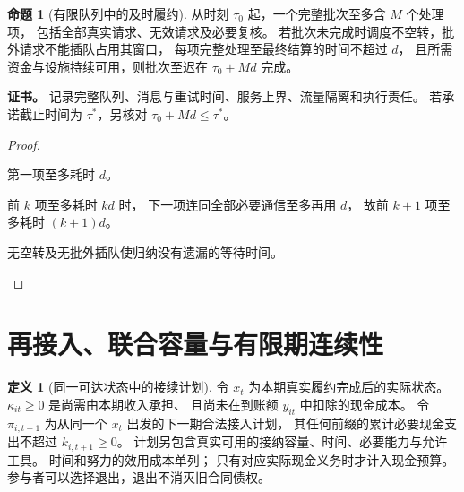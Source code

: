 \documentclass[UTF8,12pt,a4paper,openany,fontset=none,zihao=false]{ctexrep}
\theoremstyle{definition}
\newtheorem{definition}{定义}[chapter]
\newtheorem{proposition}{命题}[chapter]
\newenvironment{certificate}{\par\noindent\textbf{证书。}\ignorespaces}{\par}
\newcommand{\1}{\mathbf 1}
\begin{document}
\begin{proposition}[有限队列中的及时履约]
\label{part:prop-timely-payment}
从时刻 \(\tau_0\) 起，一个完整批次至多含 \(M\) 个处理项，
包括全部真实请求、无效请求及必要复核。
若批次未完成时调度不空转，批外请求不能插队占用其窗口，
每项完整处理至最终结算的时间不超过 \(d\)，
且所需资金与设施持续可用，则批次至迟在 \(\tau_0+Md\) 完成。
\end{proposition}
\begin{certificate}
记录完整队列、消息与重试时间、服务上界、流量隔离和执行责任。
若承诺截止时间为 \(\tau^\ast\)，另核对 \(\tau_0+Md\le\tau^\ast\)。
\end{certificate}
\begin{proof}
\begin{semanticsteps}
\item 第一项至多耗时 \(d\)。
\item 前 \(k\) 项至多耗时 \(kd\) 时，
下一项连同全部必要通信至多再用 \(d\)，
故前 \(k+1\) 项至多耗时 \((k+1)d\)。
\item 无空转及无批外插队使归纳没有遗漏的等待时间。
\end{semanticsteps}
\end{proof}

\section{再接入、联合容量与有限期连续性}

\begin{definition}[同一可达状态中的接续计划]
\label{part:def-reentry}
令 \(x_t\) 为本期真实履约完成后的实际状态。
\(\kappa_{it}\ge0\) 是尚需由本期收入承担、
且尚未在到账额 \(y_{it}\) 中扣除的现金成本。
令 \(\pi_{i,t+1}\) 为从同一个 \(x_t\) 出发的下一期合法接入计划，
其任何前缀的累计必要现金支出不超过 \(k_{i,t+1}\ge0\)。
计划另包含真实可用的接纳容量、时间、必要能力与允许工具。
时间和努力的效用成本单列；
只有对应实际现金义务时才计入现金预算。
参与者可以选择退出，退出不消灭旧合同债权。
\end{definition}
\end{document}
